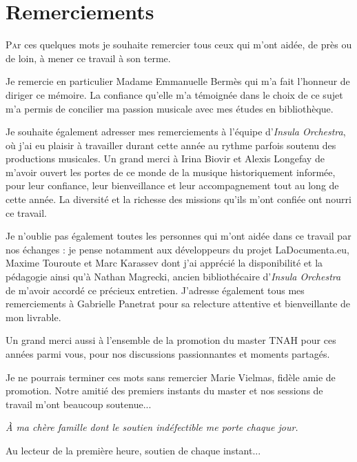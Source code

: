 \documentclass[12pt,twoside]{book}
\begin{document}
	\newpage{\pagestyle{empty}\cleardoublepage}
	
	\chapter{Remerciements}
	
	\lettrine{P}ar ces quelques mots je souhaite remercier tous ceux qui m'ont aidée, de près ou de loin, à mener ce travail à son terme.
	
	\medskip Je remercie en particulier Madame Emmanuelle Bermès qui m'a fait l'honneur de diriger ce mémoire. La confiance qu'elle m'a témoignée dans le choix de ce sujet m'a permis de concilier ma passion musicale avec mes études en bibliothèque.
	
	\medskip Je souhaite également adresser mes remerciements à l'équipe d'\textit{Insula Orchestra}, où j'ai eu plaisir à travailler durant cette année au rythme parfois soutenu des productions musicales. Un grand merci à Irina Biovir et Alexis Longefay de m'avoir ouvert les portes de ce monde de la musique historiquement informée, pour leur confiance, leur bienveillance et leur accompagnement tout au long de cette année. La diversité et la richesse des missions qu'ils m'ont confiée ont nourri ce travail.

	Je n'oublie pas également toutes les personnes qui m'ont aidée dans ce travail par nos échanges : je pense notamment aux développeurs du projet LaDocumenta.eu, Maxime Touroute et Marc Karassev dont j'ai apprécié la disponibilité et la pédagogie ainsi qu'à Nathan Magrecki, ancien bibliothécaire d'\textit{Insula Orchestra} de m'avoir accordé ce précieux entretien.  J'adresse également tous mes remerciements à Gabrielle Panetrat pour sa relecture attentive et bienveillante de mon livrable.
	
	\medskip Un grand merci aussi à l'ensemble de la promotion du master TNAH pour ces années parmi vous, pour nos discussions passionnantes et moments partagés. 
	
	\medskip Je ne pourrais terminer ces mots sans remercier Marie Vielmas, fidèle amie de promotion. Notre amitié des premiers instants du master et nos sessions de travail m'ont beaucoup soutenue...
	
	
	\vfill
	
	\begin{flushright}
		\itshape
		À ma chère famille dont le soutien indéfectible me porte chaque jour.
		
		\medskip
		
		Au lecteur de la première heure, soutien de chaque instant...
	\end{flushright}
\end{document}
